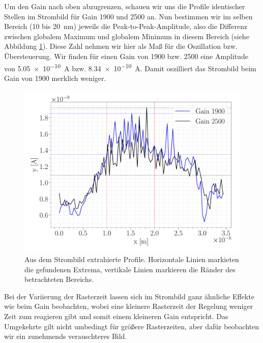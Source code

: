 Um den Gain nach oben abzugrenzen, schauen wir uns die Profile identischer Stellen im Strombild für Gain 1900 und 2500 an. Nun bestimmen wir im selben Bereich (10 bis \SI{20}{nm}) jeweils die Peak-to-Peak-Amplitude, also die Differenz zwischen globalem Maximum und globalem Minimum in diesem Bereich (siehe Abbildung \ref{GAIN_I_forward_profiles}). Diese Zahl nehmen wir hier als Maß für die Oszillation bzw. Übersteuerung. Wir finden für einen Gain von 1900 bzw. 2500 eine Amplitude von \SI{5,05e-10}{A} bzw. \SI{8,34e-10}{A}. Damit oszilliert das Strombild beim Gain von 1900 merklich weniger. 

\begin{figure}[H]
\centering
\includegraphics[width=\textwidth]{../Figures/GAIN_I_forward_profiles.pdf}
\caption{Aus dem Strombild extrahierte Profile. Horizontale Linien markieten die gefundenen Extrema, vertikale Linien markieren die Ränder des betrachteten Bereichs.}
\label{GAIN_I_forward_profiles}
\end{figure}

Bei der Variierung der Rasterzeit lassen sich im Strombild ganz ähnliche Effekte wie beim Gain beobachten, wobei eine kleinere Rasterzeit der Regelung weniger Zeit zum reagieren gibt und somit einem kleineren Gain entspricht. Das Umgekehrte gilt nicht umbedingt für größere Rasterzeiten, aber dafür beobachten wir ein zunehmends verauschteres Bild.

